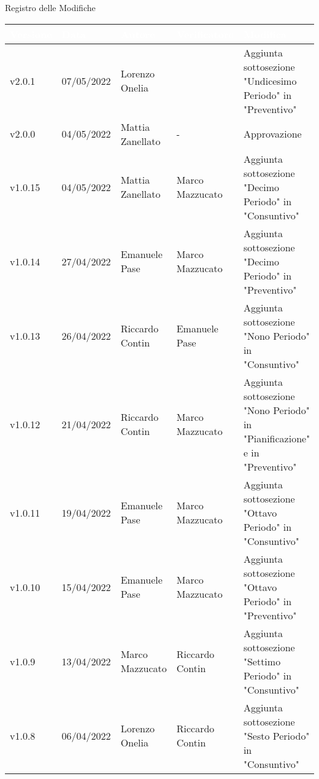 \begin{center}
  \huge{Registro delle Modifiche}
\end{center}
\renewcommand\arraystretch{1,5}
{\centering
\begin{longtable}{|C{1.8cm}|C{2.1cm}|C{2cm}|C{2.4cm}|L{4.4cm}|}
  \hline
  \textcolor[HTML]{FFFFFF}{\textbf{Versione}} & \textcolor[HTML]{FFFFFF}{\textbf{Data}} & \textcolor[HTML]{FFFFFF}{\textbf{Autore}}  & \textcolor[HTML]{FFFFFF}{\textbf{Verificatore}} & \textcolor[HTML]{FFFFFF}{\textbf{Modifica}}    \\ \hline
  v2.0.1        & 07/05/2022    & Lorenzo Onelia   &    & Aggiunta sottosezione "Undicesimo Periodo" in "Preventivo" \\ \hline
  v2.0.0        & 04/05/2022    & Mattia Zanellato   &  -  & Approvazione \\ \hline
  v1.0.15       & 04/05/2022    & Mattia Zanellato   &  Marco Mazzucato  & Aggiunta sottosezione "Decimo Periodo" in "Consuntivo" \\ \hline
  v1.0.14       & 27/04/2022    & Emanuele Pase   &   Marco Mazzucato & Aggiunta sottosezione "Decimo Periodo" in "Preventivo" \\ \hline
  v1.0.13       & 26/04/2022    & Riccardo Contin   &  Emanuele Pase  & Aggiunta sottosezione "Nono Periodo" in "Consuntivo" \\ \hline
  v1.0.12       & 21/04/2022    & Riccardo Contin   &  Marco Mazzucato   & Aggiunta sottosezione "Nono Periodo" in "Pianificazione" e in "Preventivo" \\ \hline
  v1.0.11       & 19/04/2022    & Emanuele Pase   &  Marco Mazzucato   & Aggiunta sottosezione "Ottavo Periodo" in "Consuntivo" \\ \hline
  v1.0.10       & 15/04/2022    & Emanuele Pase   &  Marco Mazzucato   & Aggiunta sottosezione "Ottavo Periodo" in "Preventivo" \\ \hline
  v1.0.9        & 13/04/2022    & Marco Mazzucato   &  Riccardo Contin   & Aggiunta sottosezione "Settimo Periodo" in "Consuntivo" \\ \hline
  v1.0.8        & 06/04/2022    & Lorenzo Onelia   &  Riccardo Contin    & Aggiunta sottosezione "Sesto Periodo" in "Consuntivo" \\ \hline

\end{longtable}}
